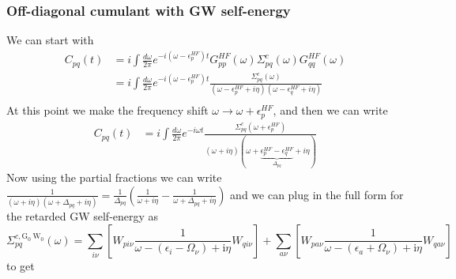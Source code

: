 \subsubsection{Off-diagonal cumulant with GW self-energy}
We can start with
\begin{align}
		C_{pq}(t) &= i \int \frac{d\omega}{2\pi} e^{-i(\omega-\epsilon_p^{HF})t} G_{pp}^{HF}(\omega) \Sigma_{pq}^c(\omega) G_{qq}^{HF}(\omega) \\
&= i \int \frac{d\omega}{2\pi} e^{-i(\omega-\epsilon_p^{HF})t} \frac{\Sigma_{pq}^c(\omega)}{(\omega - \epsilon_p^{HF} + i\eta)(\omega - \epsilon_q^{HF} + i\eta)} 
\label{eq:Cpp_m1}\\
\end{align}
At this point we make the frequency shift $\omega \to \omega + \epsilon_p^{HF}$, and then we can write
\begin{align}
    C_{pq}(t) &= i \int \frac{d\omega}{2\pi} e^{-i\omega t} \frac{\Sigma_{pq}^c(\omega + \epsilon_p^{HF})}{(\omega + i\eta)(\omega + \underbrace{\epsilon_p^{HF} - \epsilon_q^{HF}}_{\Delta_{pq}} + i\eta)}
\end{align}
Now using the partial fractions we can write $\frac{1}{(\omega + i\eta)(\omega + \Delta_{pq} + i\eta)} = \frac{1}{\Delta_{pq}}\left(\frac{1}{\omega + i\eta} - \frac{1}{\omega + \Delta_{pq} + i\eta}\right)$ and we can plug in the full form for the retarded GW self-energy as 
\begin{equation}
    \Sigma_{pq}^{c, \mathrm{G}_0 \mathrm{~W}_0}(\omega)= \sum_{i \nu}\left[W_{p i \nu} \frac{1}{\omega-\left(\epsilon_i-\Omega_\nu\right)+\mathrm{i} \eta} W_{q i \nu}\right]+ \sum_{a \nu}\left[W_{p a \nu} \frac{1}{\omega-\left(\epsilon_a+\Omega_\nu\right)+\mathrm{i} \eta} W_{q a \nu}\right]
\end{equation}
to get
